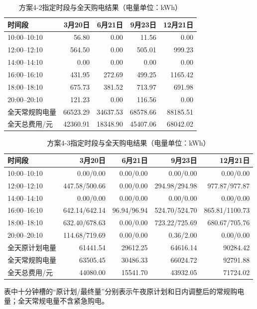 \begin{table}[H]
\centering\small
\caption{方案4-2指定时段与全天购电结果（电量单位：kWh）}\label{tab:q4-purchase-4-2}
\begin{tabular}{lrrrr}
\toprule
时间段 & 3月20日 & 6月21日 & 9月23日 & 12月21日\\
\midrule
10:00--10:10 & 56.80 & 0.00 & 11.56 & 0.00\\
12:00--12:10 & 564.50 & 0.00 & 505.01 & 999.23\\
14:00--14:10 & 0.00 & 0.00 & 0.00 & 0.00\\
16:00--16:10 & 431.95 & 272.69 & 499.25 & 1165.42\\
18:00--18:10 & 675.73 & 381.52 & 713.97 & 691.98\\
20:00--20:10 & 121.23 & 0.00 & 116.56 & 0.00\\
全天常规购电量 & 66523.29 & 34637.53 & 68578.66 & 88185.51\\
全天总费用/元 & 42360.91 & 18348.90 & 45407.06 & 68042.02\\
\bottomrule
\end{tabular}
\end{table}
\begin{table}[H]
\centering\small
\caption{方案4-3指定时段与全天购电结果（电量单位：kWh）}\label{tab:q4-purchase-4-3}
\begin{tabular}{lrrrr}
\toprule
时间段 & 3月20日 & 6月21日 & 9月23日 & 12月21日\\
\midrule
10:00--10:10 & 0.00/0.00 & 0.00/0.00 & 0.00/0.00 & 0.00/0.00\\
12:00--12:10 & 447.58/500.66 & 0.00/0.00 & 294.98/294.98 & 977.87/977.87\\
14:00--14:10 & 0.00/0.00 & 0.00/0.00 & 0.00/0.00 & 0.00/0.00\\
16:00--16:10 & 642.14/642.14 & 96.94/96.94 & 524.70/524.70 & 865.81/1100.73\\
18:00--18:10 & 632.40/678.63 & 0.00/0.00 & 723.22/725.69 & 680.67/705.76\\
20:00--20:10 & 114.68/719.69 & 0.00/0.00 & 0.36/2.00 & 0.00/0.00\\
全天原计划电量 & 61441.54 & 29612.25 & 64616.14 & 90284.42\\
全天常规购电量 & 63505.45 & 30486.33 & 66024.72 & 92791.88\\
全天总费用/元 & 44080.00 & 15541.70 & 43932.05 & 71724.02\\
\bottomrule
\end{tabular}
\end{table}
\noindent\small 表中十分钟槽的“原计划/最终量”分别表示午夜原计划和日内调整后的常规购电量；全天常规电量不含紧急购电。\normalsize

